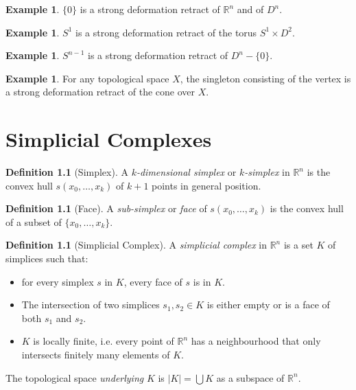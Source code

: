 \documentclass{book}
\theoremstyle{definition}
\newtheorem{df}[ax]{Definition}
\newtheorem{ex}[ax]{Example}
\begin{document}
\begin{ex}
$\{0\}$ is a strong deformation retract of $\mathbb{R}^n$ and of $D^n$.
\end{ex}

\begin{ex}
$S^1$ is a strong deformation retract of the torus $S^1 \times D^2$.
\end{ex}

\begin{ex}
$S^{n-1}$ is a strong deformation retract of $D^n - \{0\}$.
\end{ex}

\begin{ex}
For any topological space $X$, the singleton consisting of the vertex is a strong deformation retract of the cone over $X$.
\end{ex}

\chapter{Simplicial Complexes}

\begin{df}[Simplex]
A \emph{$k$-dimensional simplex} or \emph{$k$-simplex} in $\mathbb{R}^n$ is the convex hull $s(x_0, \ldots, x_k)$ of $k+1$ points in general position.
\end{df}

\begin{df}[Face]
A \emph{sub-simplex} or \emph{face} of $s(x_0, \ldots, x_k)$ is the convex hull of a subset of $\{x_0, \ldots, x_k\}$.
\end{df}

\begin{df}[Simplicial Complex]
A \emph{simplicial complex} in $\mathbb{R}^n$ is a set $K$ of simplices such that:
\begin{itemize}
\item for every simplex $s$ in $K$, every face of $s$ is in $K$.
\item The intersection of two simplices $s_1, s_2 \in K$ is either empty or is a face of both $s_1$ and $s_2$.
\item $K$ is locally finite, i.e. every point of $\mathbb{R}^n$ has a neighbourhood that only intersects finitely many elements of $K$.
\end{itemize}

The topological space \emph{underlying} $K$ is $|K| = \bigcup K$ as a subspace of $\mathbb{R}^n$.
\end{df}
\end{document}
